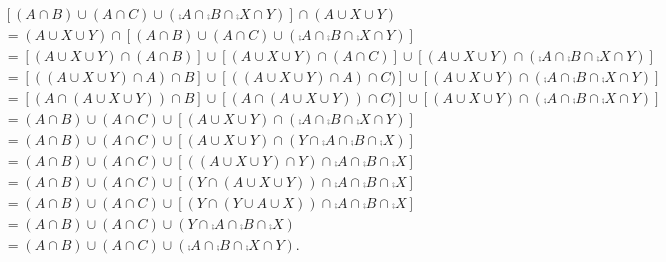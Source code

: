 \documentclass[11pt]{book}
\begin{document}
\begin{enumerate}
\begin{enumerate}
{\begin{align*}&[(A \cap B) \cup (A \cap C) \cup (\comp{A} \cap \comp{B} \cap \comp{X} \cap Y)] \cap (A \cup X \cup Y)\\&= (A \cup X \cup Y) \cap [(A \cap B) \cup (A \cap C) \cup (\comp{A} \cap \comp{B} \cap \comp{X} \cap Y)]\\&=[(A \cup X \cup Y) \cap (A \cap B)] \cup [(A \cup X \cup Y) \cap (A \cap C)] \cup [(A \cup X \cup Y) \cap (\comp{A} \cap \comp{B} \cap \comp{X} \cap Y)]\\&= [((A \cup X \cup Y) \cap A) \cap B] \cup [((A \cup X \cup Y) \cap A)\cap C)] \cup [(A \cup X \cup Y) \cap (\comp{A} \cap \comp{B} \cap \comp{X} \cap Y)]\\&= [(A \cap (A \cup X \cup Y)) \cap B] \cup [(A \cap (A \cup X \cup Y))\cap C)] \cup [(A \cup X \cup Y) \cap (\comp{A} \cap \comp{B} \cap \comp{X} \cap Y)]\\&= (A \cap B) \cup (A \cap C) \cup [(A \cup X \cup Y) \cap (\comp{A} \cap \comp{B} \cap \comp{X} \cap Y)]\\&= (A \cap B) \cup (A \cap C) \cup [(A \cup X \cup Y) \cap (Y \cap \comp{A} \cap \comp{B} \cap \comp{X})]\\&= (A \cap B) \cup (A \cap C) \cup [((A \cup X \cup Y) \cap Y) \cap \comp{A} \cap \comp{B} \cap \comp{X}]\\&= (A \cap B) \cup (A \cap C) \cup [(Y \cap (A \cup X \cup Y)) \cap \comp{A} \cap \comp{B} \cap \comp{X}]\\&= (A \cap B) \cup (A \cap C) \cup [(Y \cap (Y \cup A \cup X)) \cap \comp{A} \cap \comp{B} \cap \comp{X}]\\&= (A \cap B) \cup (A \cap C) \cup (Y \cap \comp{A} \cap \comp{B} \cap \comp{X})\\&= (A \cap B) \cup (A \cap C) \cup (\comp{A} \cap \comp{B} \cap \comp{X} \cap Y).\end{align*}
}
\end{enumerate}
\end{enumerate}
\end{document}
